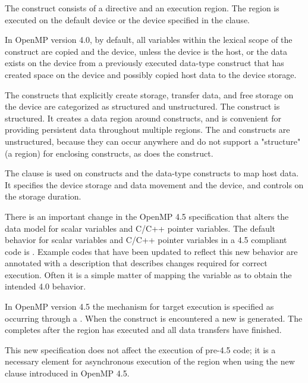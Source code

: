 \label{chap:devices}

The  construct consists of a  directive 
and an execution region. The  region is executed on
the default device or the device specified in the  
clause. 

In OpenMP version 4.0, by default, all variables within the lexical
scope of the construct are copied  and  the
device, unless the device is the host, or the data exists on the
device from a previously executed data-type construct that
has created space on the device and possibly copied host
data to the device storage.

The constructs that explicitly
create storage, transfer data, and free storage on the device
are categorized as structured and unstructured. The
  construct is structured. It creates
a data region around  constructs, and is
convenient for providing persistent data throughout multiple
 regions. The    and 
   constructs are unstructured, because 
they can occur anywhere and do not support a "structure" 
(a region) for enclosing  constructs, as does the
  construct. 

The  clause is used on  
constructs and the data-type constructs to map host data. It 
specifies the device storage and data movement  and 
the device, and controls on the storage duration.

There is an important change in the OpenMP 4.5 specification
that alters the data model for scalar variables and C/C++ pointer variables.
The default behavior for scalar variables and C/C++ pointer variables
in a 4.5 compliant code is . Example
codes that have been updated to reflect this new behavior are
annotated with a description that describes changes required
for correct execution. Often it is a simple matter of mapping
the variable as  to obtain the intended 4.0 behavior.

In OpenMP version 4.5 the mechanism for target
execution is specified as occurring through a . 
When the  construct is encountered a new 
 is generated. The  
completes after the  region has executed and all data 
transfers have finished.

This new specification does not affect the execution of 
pre-4.5 code; it is a necessary element for asynchronous 
execution of the  region when using the new  
clause introduced in OpenMP 4.5.



